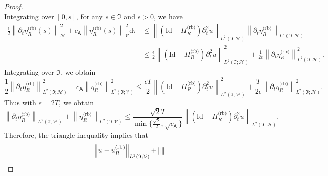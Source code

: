 \documentclass[10pt,a4paper]{amsart}
\newcommand{\norm}[1]{\left \lVert #1 \right \rVert}
\begin{document}
\begin{proof}
\begin{equation}
\end{equation}
Integrating over $[0,s]$, for any $s \in  \mathfrak{I}$ and $\epsilon>0$, we have
\begin{equation}
\begin{aligned}
   \frac{1}{2} \norm{	
        \partial_t
        \eta^{\text{(rb)}}_R(s)
    }^2_{\mathcal{H}}
	+
	c_{\mathsf{A}}
	\norm{
		\eta^{\text{(rb)}}_R(s)
	}^2_{\mathcal{V}}
	\text{d}\tau
    &
	\leq
    \norm{
    \left(
        \text{Id}
        -
        \Pi^{\text{(rb)}}_R
    \right) \partial^2_t u
    }_{L^2(\mathfrak{I};\mathcal{H})}
	\norm{
		\partial_t \eta^{\text{(rb)}}_R
	}_{L^2(\mathfrak{I};\mathcal{H})}
    \\
    &
    \leq
    \frac{\epsilon}{2}
    \norm{
    \left(
        \text{Id}
        -
       \Pi^{\text{(rb)}}_R
    \right) \partial^2_t u
    }^2_{L^2(\mathfrak{I};\mathcal{H})}
	+
    \frac{1}{2\epsilon}
    \norm{
		\partial_t \eta^{\text{(rb)}}_R
	}^2_{L^2(\mathfrak{I};\mathcal{H})}.
\end{aligned}
\end{equation}
Integrating over $\mathfrak{I}$, we obtain
\begin{equation}
   \frac{1}{2}  \norm{	
        \partial_t
        \eta^{\text{(rb)}}_R
    }^2_{L^2(\mathfrak{I};\mathcal{H})}
	+
	c_{\mathsf{A}}
	\norm{
		\eta^{\text{(rb)}}_R
	}^2_{L^2(\mathfrak{I};\mathcal{V})}
    \leq
    \frac{\epsilon T}{2}
    \norm{
    \left(
        \text{Id}
        -
       \Pi^{\text{(rb)}}_R
    \right) \partial^2_t u
    }^2_{L^2(\mathfrak{I};\mathcal{H})}
	+
    \frac{T}{2\epsilon}
    \norm{
		\partial_t \eta^{\text{(rb)}}_R
	}^2_{L^2(\mathfrak{I};\mathcal{H})}.
\end{equation}
Thus with $\epsilon=2T$, we obtain
\begin{equation}\label{eq:bound_eta_rb}
    \norm{	
        \partial_t
        \eta^{\text{(rb)}}_R
    }_{L^2(\mathfrak{I};\mathcal{H})}
	+
	\norm{
		\eta^{\text{(rb)}}_R
	}_{L^2(\mathfrak{I};\mathcal{V})}
    \leq
    \frac{\sqrt{2}T}{\min\{\frac{\sqrt{2}}{2} ,\sqrt{ c_{\mathsf{A}}}\}}
    \norm{
        \left(
            \text{Id}
            -
            \Pi^{\text{(rb)}}_R
        \right) \partial^2_t u
    }_{L^2(\mathfrak{I};\mathcal{H})}.
\end{equation}
Therefore, the triangle inequality implies that
\begin{equation}
\begin{aligned}
	\norm{
		u
		-
		u^{\normalfont\text{(rb)}}_R
	}_{L^2(\mathfrak{I};\mathcal{V})}
    +
    &
	\norm{
}
\end{aligned}
\end{equation}
\end{proof}
\end{document}
